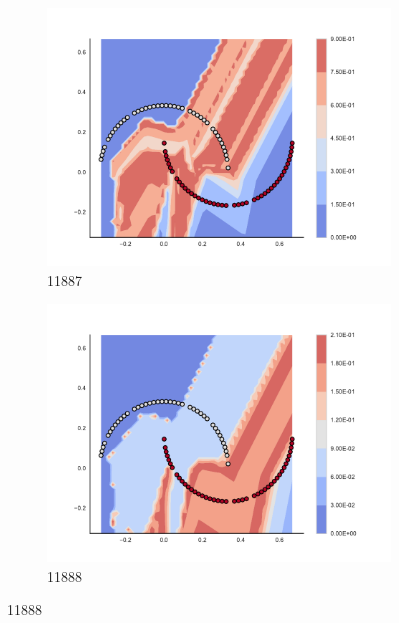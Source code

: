 \begin{figure}[h]
\begin{subfigure}[b]{0.09\textwidth}
    \includegraphics[clip, trim=2.35cm 1.75cm 4.5cm 0cm,width=\textwidth]{img/convergence/11887.pdf}
    \caption{11887}
    \label{fig:convergence_11887}
\end{subfigure}
%
\begin{subfigure}[b]{0.09\textwidth}
    \includegraphics[clip, trim=2.35cm 1.75cm 4.5cm 0cm,width=\textwidth]{img/convergence/11888.pdf}
    \caption{11888}
    \label{fig:convergence_11888}
\end{subfigure}
%
        \end{figure}
